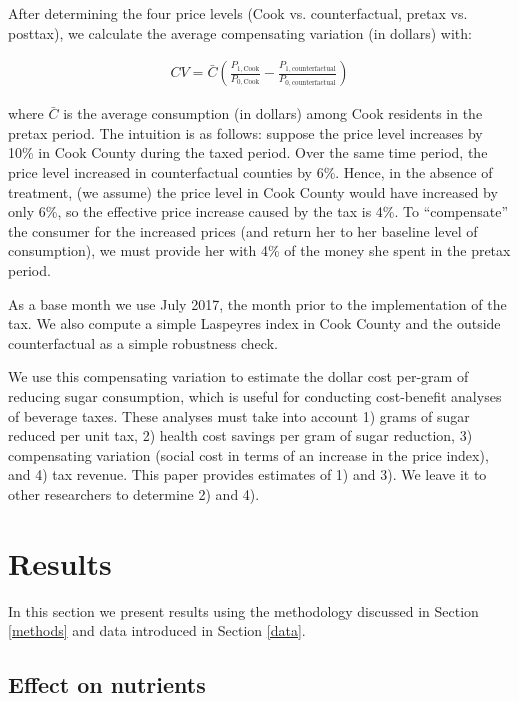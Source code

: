 \documentclass[12pt]{article}
\begin{document}
After determining the four price levels (Cook vs. counterfactual, pretax vs. posttax), we calculate the average compensating variation (in dollars) with:

\begin{align}
CV = \bar{C}\left(\frac{P_{1,\text{Cook}}}{P_{0,\text{Cook}}} - \frac{P_{1,\text{counterfactual}}}{P_{0,\text{counterfactual}}}\right) \label{cv}
\end{align}

where $\bar{C}$ is the average consumption (in dollars) among Cook residents in the pretax period. The intuition is as follows: suppose the price level increases by 10\% in Cook County during the taxed period. Over the same time period, the price level increased in counterfactual counties by 6\%. Hence, in the absence of treatment, (we assume) the price level in Cook County would have increased by only 6\%, so the effective price increase caused by the tax is 4\%. To ``compensate'' the consumer for the increased prices (and return her to her baseline level of consumption), we must provide her with 4\% of the money she spent in the pretax period.

As a base month we use July 2017, the month prior to the implementation of the tax. We also compute a simple Laspeyres index in Cook County and the outside counterfactual as a simple robustness check.

We use this compensating variation to estimate the dollar cost per-gram of reducing sugar consumption, which is useful for conducting cost-benefit analyses of beverage taxes. These analyses must take into account 1) grams of sugar reduced per unit tax, 2) health cost savings per gram of sugar reduction, 3) compensating variation (social cost in terms of an increase in the price index), and 4) tax revenue. This paper provides estimates of 1) and 3). We leave it to other researchers to determine 2) and 4).


\section{Results} \label{results}
In this section we present results using the methodology discussed in Section \ref{methods} and data introduced in Section \ref{data}.

\subsection{Effect on nutrients}
\end{document}
